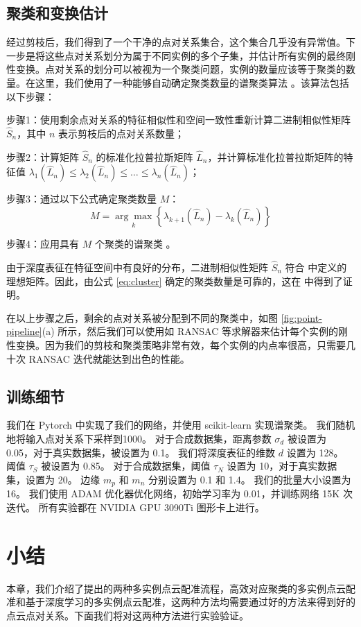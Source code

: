 \subsection{聚类和变换估计}\label{sec:clusterandtransform}
经过剪枝后，我们得到了一个干净的点对关系集合，这个集合几乎没有异常值。下一步是将这些点对关系划分为属于不同实例的多个子集，并估计所有实例的最终刚性变换。点对关系的划分可以被视为一个聚类问题，实例的数量应该等于聚类的数量。在这里，我们使用了一种能够自动确定聚类数量的谱聚类算法 \cite{von2007tutorial,li2007noise}。该算法包括以下步骤：

步骤1：使用剩余点对关系的特征相似性和空间一致性重新计算二进制相似性矩阵 $\hat{S}_n$，其中 $n$ 表示剪枝后的点对关系数量；

步骤2：计算矩阵 $\hat{S}_n$ 的标准化拉普拉斯矩阵 $\hat{L}_n$，并计算标准化拉普拉斯矩阵的特征值 $\lambda_{1}\left(\hat{L}_{n}\right) \leq \lambda_{2}\left(\hat{L}_{n}\right) \leq \ldots \leq \lambda_{n}\left(\hat{L}_{n}\right)$；

步骤3：通过以下公式确定聚类数量 $M$：
\begin{equation}
  \label{eq:cluster}
  M=\underset{k}{\arg \max }\left\{\lambda_{k+1}\left(\hat{L}_{n}\right)-\lambda_{k}\left(\hat{L}_{n}\right)\right\}
\end{equation}

步骤4：应用具有 $M$ 个聚类的谱聚类 \cite{von2007tutorial} 。

由于深度表征在特征空间中有良好的分布，二进制相似性矩阵 $\hat{S}_n$ 符合 \cite{li2007noise} 中定义的理想矩阵。因此，由公式 \ref{eq:cluster} 确定的聚类数量是可靠的，这在 \cite{li2007noise} 中得到了证明。

在以上步骤之后，剩余的点对关系被分配到不同的聚类中，如图 \ref{fig:point-pipeline}(a) 所示，然后我们可以使用如 RANSAC \cite{fischler1981random} 等求解器来估计每个实例的刚性变换。因为我们的剪枝和聚类策略非常有效，每个实例的内点率很高，只需要几十次 RANSAC 迭代就能达到出色的性能。

\subsection{训练细节}
我们在 Pytorch \cite{PyTorch} 中实现了我们的网络，并使用 scikit-learn \cite{Pedregosa2011Scikit} 实现谱聚类。
我们随机地将输入点对关系下采样到1000。
对于合成数据集，距离参数 $\sigma_d$ 被设置为 0.05，对于真实数据集，被设置为 0.1。
我们将深度表征的维数 $d$ 设置为 128。
阈值 $\tau_S$ 被设置为 0.85。
对于合成数据集，阈值 $\tau_N$ 设置为 10，对于真实数据集，设置为 20。
边缘 $m_p$ 和 $m_n$ 分别设置为 0.1 和 1.4。
我们的批量大小设置为 16。
我们使用 ADAM 优化器优化网络，初始学习率为 0.01，并训练网络 15K 次迭代。
所有实验都在 NVIDIA GPU 3090Ti 图形卡上进行。

\section{小结}
本章，我们介绍了提出的两种多实例点云配准流程，高效对应聚类的多实例点云配准和基于深度学习的多实例点云配准，这两种方法均需要通过好的方法来得到好的点云点对关系。下面我们将对这两种方法进行实验验证。